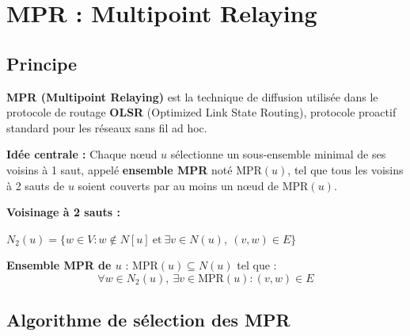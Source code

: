 \documentclass[12pt,a4paper]{article}
\begin{document}
\newpage

\section{MPR : Multipoint Relaying}

\subsection{Principe}

\begin{notecours}
\textbf{MPR (Multipoint Relaying)} est la technique de diffusion utilisée dans le protocole
de routage \textbf{OLSR} (Optimized Link State Routing), protocole proactif standard pour
les réseaux sans fil ad hoc.

\textbf{Idée centrale :} Chaque nœud $u$ sélectionne un sous-ensemble minimal de ses voisins
à 1 saut, appelé \textbf{ensemble MPR} noté $\text{MPR}(u)$, tel que tous les voisins à 2 sauts
de $u$ soient couverts par au moins un nœud de $\text{MPR}(u)$.
\end{notecours}

\begin{definition}
\textbf{Voisinage à 2 sauts :}

$N_2(u) = \{w \in V : w \notin N[u]\ \text{et}\ \exists v \in N(u),\ (v,w) \in E\}$

\textbf{Ensemble MPR de $u$} : $\text{MPR}(u) \subseteq N(u)$ tel que :
$$\forall w \in N_2(u),\ \exists v \in \text{MPR}(u) : (v, w) \in E$$
\end{definition}

\subsection{Algorithme de sélection des MPR}
\end{document}
